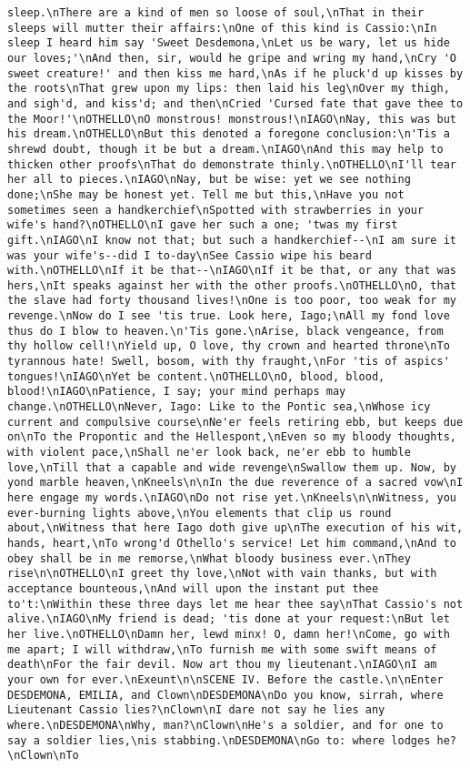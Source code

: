 \begin{verbatim}
sleep.\nThere are a kind of men so loose of soul,\nThat in their sleeps will mutter their affairs:\nOne of this kind is Cassio:\nIn sleep I heard him say 'Sweet Desdemona,\nLet us be wary, let us hide our loves;'\nAnd then, sir, would he gripe and wring my hand,\nCry 'O sweet creature!' and then kiss me hard,\nAs if he pluck'd up kisses by the roots\nThat grew upon my lips: then laid his leg\nOver my thigh, and sigh'd, and kiss'd; and then\nCried 'Cursed fate that gave thee to the Moor!'\nOTHELLO\nO monstrous! monstrous!\nIAGO\nNay, this was but his dream.\nOTHELLO\nBut this denoted a foregone conclusion:\n'Tis a shrewd doubt, though it be but a dream.\nIAGO\nAnd this may help to thicken other proofs\nThat do demonstrate thinly.\nOTHELLO\nI'll tear her all to pieces.\nIAGO\nNay, but be wise: yet we see nothing done;\nShe may be honest yet. Tell me but this,\nHave you not sometimes seen a handkerchief\nSpotted with strawberries in your wife's hand?\nOTHELLO\nI gave her such a one; 'twas my first gift.\nIAGO\nI know not that; but such a handkerchief--\nI am sure it was your wife's--did I to-day\nSee Cassio wipe his beard with.\nOTHELLO\nIf it be that--\nIAGO\nIf it be that, or any that was hers,\nIt speaks against her with the other proofs.\nOTHELLO\nO, that the slave had forty thousand lives!\nOne is too poor, too weak for my revenge.\nNow do I see 'tis true. Look here, Iago;\nAll my fond love thus do I blow to heaven.\n'Tis gone.\nArise, black vengeance, from thy hollow cell!\nYield up, O love, thy crown and hearted throne\nTo tyrannous hate! Swell, bosom, with thy fraught,\nFor 'tis of aspics' tongues!\nIAGO\nYet be content.\nOTHELLO\nO, blood, blood, blood!\nIAGO\nPatience, I say; your mind perhaps may change.\nOTHELLO\nNever, Iago: Like to the Pontic sea,\nWhose icy current and compulsive course\nNe'er feels retiring ebb, but keeps due on\nTo the Propontic and the Hellespont,\nEven so my bloody thoughts, with violent pace,\nShall ne'er look back, ne'er ebb to humble love,\nTill that a capable and wide revenge\nSwallow them up. Now, by yond marble heaven,\nKneels\n\nIn the due reverence of a sacred vow\nI here engage my words.\nIAGO\nDo not rise yet.\nKneels\n\nWitness, you ever-burning lights above,\nYou elements that clip us round about,\nWitness that here Iago doth give up\nThe execution of his wit, hands, heart,\nTo wrong'd Othello's service! Let him command,\nAnd to obey shall be in me remorse,\nWhat bloody business ever.\nThey rise\n\nOTHELLO\nI greet thy love,\nNot with vain thanks, but with acceptance bounteous,\nAnd will upon the instant put thee to't:\nWithin these three days let me hear thee say\nThat Cassio's not alive.\nIAGO\nMy friend is dead; 'tis done at your request:\nBut let her live.\nOTHELLO\nDamn her, lewd minx! O, damn her!\nCome, go with me apart; I will withdraw,\nTo furnish me with some swift means of death\nFor the fair devil. Now art thou my lieutenant.\nIAGO\nI am your own for ever.\nExeunt\n\nSCENE IV. Before the castle.\n\nEnter DESDEMONA, EMILIA, and Clown\nDESDEMONA\nDo you know, sirrah, where Lieutenant Cassio lies?\nClown\nI dare not say he lies any where.\nDESDEMONA\nWhy, man?\nClown\nHe's a soldier, and for one to say a soldier lies,\nis stabbing.\nDESDEMONA\nGo to: where lodges he?\nClown\nTo 
\end{verbatim}

